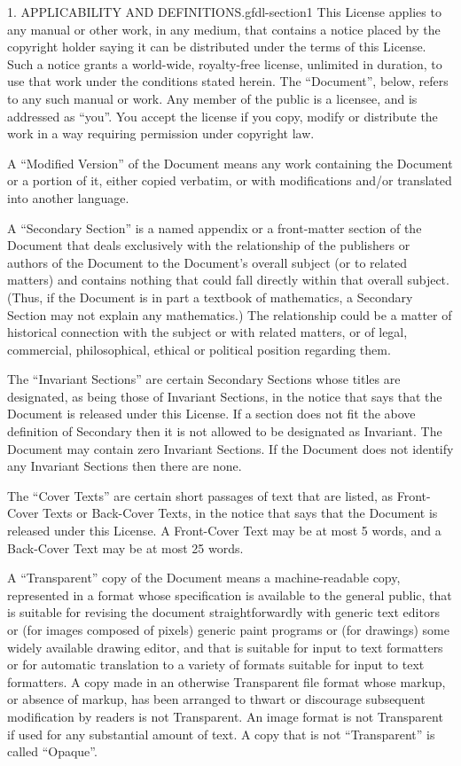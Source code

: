 \documentclass[10pt,]{book}
\numberwithin{equation}{section}
\begin{document}
\begin{paragraphs}{1. APPLICABILITY AND DEFINITIONS.}{gfdl-section1}%
\hypertarget{p-1529}{}%
This License applies to any manual or other work, in any medium, that contains a notice placed by the copyright holder saying it can be distributed under the terms of this License. Such a notice grants a world-wide, royalty-free license, unlimited in duration, to use that work under the conditions stated herein. The ``Document'', below, refers to any such manual or work. Any member of the public is a licensee, and is addressed as ``you''. You accept the license if you copy, modify or distribute the work in a way requiring permission under copyright law.%
\par
\hypertarget{p-1530}{}%
A ``Modified Version'' of the Document means any work containing the Document or a portion of it, either copied verbatim, or with modifications and/or translated into another language.%
\par
\hypertarget{p-1531}{}%
A ``Secondary Section'' is a named appendix or a front-matter section of the Document that deals exclusively with the relationship of the publishers or authors of the Document to the Document's overall subject (or to related matters) and contains nothing that could fall directly within that overall subject. (Thus, if the Document is in part a textbook of mathematics, a Secondary Section may not explain any mathematics.) The relationship could be a matter of historical connection with the subject or with related matters, or of legal, commercial, philosophical, ethical or political position regarding them.%
\par
\hypertarget{p-1532}{}%
The ``Invariant Sections'' are certain Secondary Sections whose titles are designated, as being those of Invariant Sections, in the notice that says that the Document is released under this License. If a section does not fit the above definition of Secondary then it is not allowed to be designated as Invariant. The Document may contain zero Invariant Sections. If the Document does not identify any Invariant Sections then there are none.%
\par
\hypertarget{p-1533}{}%
The ``Cover Texts'' are certain short passages of text that are listed, as Front-Cover Texts or Back-Cover Texts, in the notice that says that the Document is released under this License. A Front-Cover Text may be at most 5 words, and a Back-Cover Text may be at most 25 words.%
\par
\hypertarget{p-1534}{}%
A ``Transparent'' copy of the Document means a machine-readable copy, represented in a format whose specification is available to the general public, that is suitable for revising the document straightforwardly with generic text editors or (for images composed of pixels) generic paint programs or (for drawings) some widely available drawing editor, and that is suitable for input to text formatters or for automatic translation to a variety of formats suitable for input to text formatters. A copy made in an otherwise Transparent file format whose markup, or absence of markup, has been arranged to thwart or discourage subsequent modification by readers is not Transparent. An image format is not Transparent if used for any substantial amount of text. A copy that is not ``Transparent'' is called ``Opaque''.%

\end{paragraphs}
\end{document}
